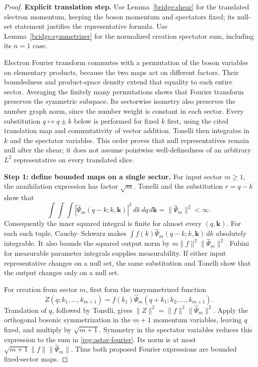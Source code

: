 \documentclass[11pt,a4paper]{article}
\theoremstyle{definition}
\theoremstyle{remark}
\begin{document}
\begin{proof}
\noindent\textbf{Explicit translation step.} Use Lemma~\ref{bridge:shear} for the translated electron momentum,
keeping the boson momentum and spectators fixed; its null-set statement
justifies the representative formula. Use Lemma~\ref{bridge:symmetrizer}
for the normalized creation spectator sum, including its $n=1$ case.

Electron Fourier transform commutes with a permutation of the boson
variables on elementary products, because the two maps act on
different factors. Their boundedness and product-space density extend
that equality to each entire sector. Averaging the finitely many
permutations shows that Fourier transform preserves the symmetric
subspace. Its sectorwise isometry also preserves the number graph
norm, since the number weight is constant in each sector.
Every substitution $q\mapsto q\pm k$ below is performed for
fixed $k$ first, using the cited translation map and commutativity
of vector addition. Tonelli then integrates in $k$ and the
spectator variables. This order proves that null representatives
remain null after the shear; it does not assume pointwise
well-definedness of an arbitrary $L^2$ representative on every
translated slice.

\textbf{Step 1: define bounded maps on a single sector.}
For input sector \(m\geq1\), the annihilation expression has factor
\(\sqrt m\). Tonelli and the substitution \(r=q-k\) show that
\[
 \int\!\int\!\int
 |\widehat\Psi_m(q-k;k,\mathbf k)|^2\,dk\,dq\,d\mathbf k
 =\|\widehat\Psi_m\|^2<\infty.
\]
Consequently the inner squared integral is finite for almost every
\((q,\mathbf k)\). For each such tuple, Cauchy--Schwarz makes
\(\int\overline{f(k)}\widehat\Psi_m(q-k;k,\mathbf k)\,dk\)
absolutely integrable. It also bounds the squared output norm by
\(m\|f\|^2\|\widehat\Psi_m\|^2\). Fubini for measurable
parameter integrals supplies measurability. If either input
representative changes on a null set, the same substitution and
Tonelli show that the output changes only on a null set.

For creation from sector \(m\), first form the unsymmetrized function
\[
 Z(q;k_1,\ldots,k_{m+1})
 =f(k_1)\widehat\Psi_m(q+k_1;k_2,\ldots,k_{m+1}).
\]
Translation of \(q\), followed by Tonelli, gives
\(\|Z\|^2=\|f\|^2\|\widehat\Psi_m\|^2\).
Apply the orthogonal bosonic symmetrization in the \(m+1\) momentum
variables, leaving \(q\) fixed, and multiply by \(\sqrt{m+1}\).
Symmetry in the spectator variables reduces this expression to the
sum in \eqref{reg:astar-fourier}. Its norm is at most
\(\sqrt{m+1}\|f\|\|\widehat\Psi_m\|\).
Thus both proposed Fourier expressions are bounded fixed-sector maps.


\end{proof}
\end{document}
